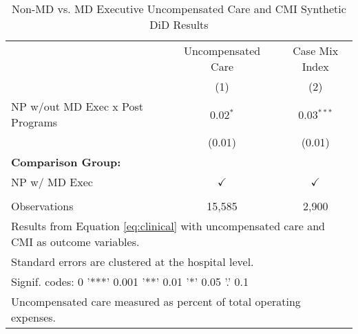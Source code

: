 \begin{table}[ht!]

\caption{\label{tab:MD_noMD_uncompCMI_synth}Non-MD vs. MD Executive Uncompensated Care and CMI Synthetic DiD Results}
\centering
\begin{tabular}[t]{lcc}
\toprule
\multicolumn{1}{c}{ } & \multicolumn{1}{c}{Uncompensated Care} & \multicolumn{1}{c}{Case Mix Index} \\
 & (1) & (2)\\
\midrule
NP w/out MD Exec x Post Programs & 0.02$^{*}$ & 0.03$^{***}$\\
 & (0.01) & (0.01)\\
\textbf{Comparison Group:} &  & \\
NP w/ MD Exec & $\checkmark$ & $\checkmark$\\
 &  & \\
\addlinespace
Observations & 15,585 & 2,900\\
\bottomrule
\multicolumn{3}{l}{\textsuperscript{} Results from Equation \ref{eq:clinical} with uncompensated care and CMI as outcome variables.}\\
\multicolumn{3}{l}{\textsuperscript{} Standard errors are clustered at the hospital level.}\\
\multicolumn{3}{l}{\textsuperscript{} Signif. codes: 0 '***' 0.001 '**' 0.01 '*' 0.05 '.' 0.1}\\
\multicolumn{3}{l}{\textsuperscript{} Uncompensated care measured as percent of total operating expenses.}\\
\end{tabular}
\end{table}
